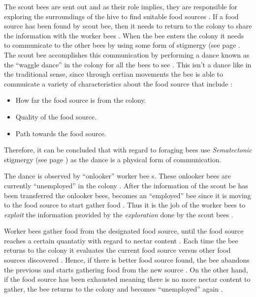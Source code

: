 The scout bees are sent out and as their role implies, they are responsible for exploring the surroundings of the hive to find suitable food sources \cite{ABCCompareStudy}. If a food source has been found by scout bee, then it needs to return to the colony to share the information with the worker bees \cite{ABCCompareStudy}. When the bee enters the colony it needs to communicate to the other bees by using some form of stigmergy (see page \pageref{def:stigmergy} \cite{ABCCompareStudy}. The scout bee accomplishes this communication by performing a dance known as the ``waggle dance'' in the colony for all the bees to see \cite{ABCCompareStudy}. This isn't a dance like in the traditional sense, since through certian movements the bee is able to commuicate a variety of characteristics about the food source that include \cite{ABCCompareStudy}:
\begin{itemize}
\item How far the food source is from the colony.
\item Quality of the food source.
\item Path towards the food source.
\end{itemize}

Therefore, it can be concluded that with regard to foraging bees use \emph{Sematectonic} stigmergy (see page \pageref{def:sematectonic}) as the dance is a physical form of communication.

The dance is observed by ``onlooker'' worker bee \cite{ABCCompareStudy,ABCImageEnhancement}s. These onlooker bees are currently ``unemployed'' in the colony \cite{ABCCompareStudy,ABCImageEnhancement}. After the information of the scout be has been transferred the onlooker bees, becomes an ``employed'' bee since it is moving to the food source to start gather food \cite{ABCCompareStudy,ABCImageEnhancement}. Thus it is the job of the worker bees to \emph{exploit} the information provided by the \emph{exploration} done by the scout bees \cite{ABCCompareStudy,ABCNumericalOptimization}. 

Worker bees gather food from the designated food source, until the food source reaches a certain quantatiy with regard to nectar content \cite{ABCCompareStudy,ABCNumericalOptimization}. Each time the bee returns to the colony it evaluates the current food source versus other food sources discovered \cite{ABCCompareStudy,ABCNumericalOptimization}. Hence, if there is better food source found, the bee abandons the previous and starts gathering food from the new source \cite{ABCCompareStudy,ABCNumericalOptimization}. On the other hand, if the food source has been exhausted meaning there is no more nectar content to gather, the bee returns to the colony and becomes ``unemployed'' again \cite{ABCCompareStudy,ABCNumericalOptimization}.

